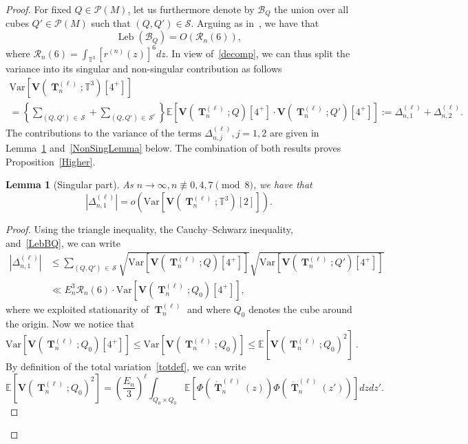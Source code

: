 \documentclass[10pt]{amsart}
\newtheorem{lemm}[theo]{Lemma}\newtheorem{prop}[theo]{Proposition}\newtheorem{coro}[theo]{Corollary}\newtheorem{conj}[theo]{Conjecture}
\theoremstyle{definition}\newtheorem{defi}[theo]{Definition}\newtheorem{rema}[theo]{Remark}\newtheorem{exam}[theo]{Example}\newtheorem{exem}[theo]{Example}\newtheorem{nota}[theo]{Notation}
\DeclareMathOperator{\Leb}{Leb}
\DeclareMathOperator{\bT}{\mathbf{T}}
\newcommand{\bfv}{\mathbf{V}}
\newcommand{\clP}{\mathcal{P}}
\newcommand{\clS}{\mathcal{S}}
\newcommand{\clR}{\mathcal{R}}
\newcommand{\clB}{\mathcal{B}}
\newcommand{\T}{\mathbb{T}^3}
\newcommand{\E}[1]{\mathbb{E}\left[#1\right]}
\newcommand{\V}[1]{\mathrm{Var}{\left[#1\right]}}
\newcommand{\notcon}[3]{ {#1} \not\equiv {#2} \pmod {#3} }
\begin{document}
\begin{proof}
For fixed $Q \in \clP(M)$, let us furthermore denote by $\clB_Q$ the union over all cubes $Q' \in \clP(M)$ such that $(Q,Q') \in \clS$. Arguing as in~\cite[Lemma~6.3]{DNPR16}, we have that
\begin{equation}\label{LebBQ}
\Leb(\clB_Q) = O(\clR_n(6)),
\end{equation}
where $\clR_n(6)=\int_{\T} [r^{(n)}(z)]^6 dz$. In view of~\eqref{decomp}, we can thus split the variance into its singular and non-singular contribution as follows
\begin{multline*}
\V{\bfv\left(\bT_n^{(\ell)};\T\right)\left[4^+\right]}\\
= \left\{\sum_{(Q,Q')\,\in\,\clS } + \sum_{(Q,Q')\,\in\,\clS^c}\right\}
\E{\bfv\left(\bT_n^{(\ell)};Q\right)\left[4^+\right] \cdot \bfv\left(\bT_n^{(\ell)};Q'\right)\left[4^+\right]} := \Delta_{n,1}^{(\ell)} + \Delta_{n,2}^{(\ell)}.
\end{multline*}
The contributions to the variance of the terms $\Delta_{n,j}^{(\ell)}, j=1,2$ are given in Lemma~\ref{SingLemma} and~\ref{NonSingLemma} below. The combination of both results proves Proposition~\ref{Higher}.
\begin{lemm}[Singular part]\label{SingLemma}
As $n \to \infty, \notcon{n}{0,4,7}{8}$, we have that
\[
\left| \Delta_{n,1}^{(\ell)}\right| = o\left(\V{\bfv\left(\bT_n^{(\ell)};\T\right)[2]}\right).
\]
\end{lemm}
\begin{proof}
Using the triangle inequality, the Cauchy--Schwarz inequality, and~\eqref{LebBQ}, we can write
\begin{align}\label{EstOne}
\left|\Delta_{n,1}^{(\ell)}\right| &\leq \sum_{(Q,Q')\,\in\,\clS}
\sqrt{\V{\bfv\left(\bT_n^{(\ell)};Q\right)\left[4^+\right]}}
\sqrt{\V{\bfv\left(\bT_n^{(\ell)};Q'\right)\left[4^+\right]}} \\
&\ll E_n^3 \clR_n(6)
\cdot \V{\bfv\left(\bT_n^{(\ell)};Q_0\right)\left[4^+\right]},
\end{align}
where we exploited stationarity of $\bT_n^{(\ell)}$ and where $Q_0$ denotes the cube around the origin. Now we notice that
\begin{equation*}
\V{\bfv\left(\bT_n^{(\ell)};Q_0\right)\left[4^+\right]} \leq \V{\bfv\left(\bT_n^{(\ell)};Q_0\right)}
\leq \E{\bfv\left(\bT_n^{(\ell)};Q_0\right)^2} \ .
\end{equation*}
By definition of the total variation~\eqref{totdef}, we can write
\[
\E{\bfv\left(\bT_n^{(\ell)};Q_0\right)^2} = \left(\frac{E_n}{3}\right)^{\ell}
\int_{Q_0\times Q_0} \E{ \Phi\left(\dot{\bT}_n^{(\ell)}(z)\right) \Phi\left(\dot{\bT}_n^{(\ell)}(z')\right) } dzdz'.
\]
\end{proof}
\end{proof}
\end{document}
